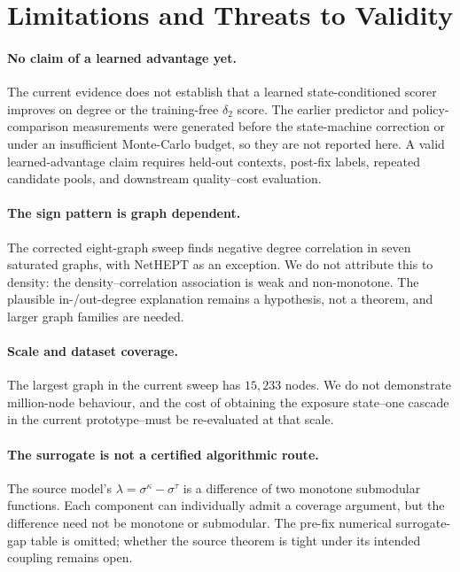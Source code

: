 \section{Limitations and Threats to Validity}
\label{sec:limitations}

\paragraph{No claim of a learned advantage yet.}
The current evidence does not establish that a learned state-conditioned scorer improves on degree
or the training-free $\delta_2$ score.  The earlier predictor and policy-comparison measurements
were generated before the state-machine correction or under an insufficient Monte-Carlo budget,
so they are not reported here.  A valid learned-advantage claim requires held-out contexts,
post-fix labels, repeated candidate pools, and downstream quality--cost evaluation.

\paragraph{The sign pattern is graph dependent.}
The corrected eight-graph sweep finds negative degree correlation in seven saturated graphs, with
NetHEPT as an exception.  We do not attribute this to density: the density--correlation
association is weak and non-monotone.  The plausible in-/out-degree explanation remains a
hypothesis, not a theorem, and larger graph families are needed.

\paragraph{Scale and dataset coverage.}
The largest graph in the current sweep has $15{,}233$ nodes.  We do not demonstrate million-node
behaviour, and the cost of obtaining the exposure state--one cascade in the current prototype--must
be re-evaluated at that scale.

\paragraph{The surrogate is not a certified algorithmic route.}
The source model's $\lambda=\sigma^\kappa-\sigma^\tau$ is a difference of two monotone
submodular functions.  Each component can individually admit a coverage argument, but the
difference need not be monotone or submodular.  The pre-fix numerical surrogate-gap table is
omitted; whether the source theorem is tight under its intended coupling remains open.

